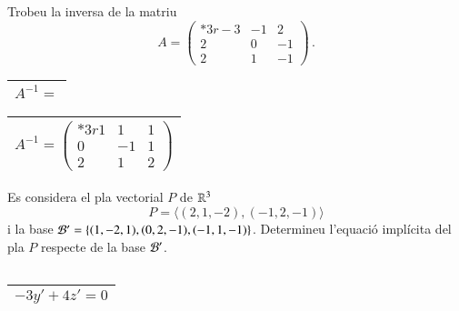\documentclass[11pt,catalan]{article}
\begin{document}
\begin{enunciat}
Trobeu la inversa de la matriu 
\[
  A = \begin{pmatrix}{*{3}r} -3 & -1 & 2\\ 2 & 0 & -1\\ 2 & 1 & -1\end{pmatrix}\,.
\]
\end{enunciat}

\begin{quadricula}
\begin{tabular}{|L{5cm}{1.25cm}|}
\hline
$A^{-1}=$ \\
\hline
\end{tabular}
\end{quadricula}

\begin{solucio}
\begin{center}
\begin{tabular}{|C{5cm}{1.25cm}|}
\hline
$A^{-1}=\begin{pmatrix}{*{3}r} 1 & 1 & 1\\ 0 & -1 & 1\\ 2 & 1 & 2\end{pmatrix}$ \\
\hline
\end{tabular}
\end{center}
\end{solucio}


\begin{enunciat}
Es considera el pla vectorial $P$ de $\rn 3$
\[
  P = \langle (2,1,-2), (-1,2,-1) \rangle
\]
i la base $\cal B'=\{(1,-2,1),(0,2,-1),(-1,1,-1)\}$. Determineu l'equació implícita del pla $P$ respecte de la base $\cal B'$.
\end{enunciat}

\begin{quadricula}
\begin{tabular}{|C{5cm}{0.5cm}|}
\hline
 \\
\hline
\end{tabular}
\end{quadricula}

\begin{solucio}
\begin{center}
\begin{tabular}{|C{5cm}{0.5cm}|}
\hline
$- 3 y' + 4 z' = 0$ \\
\hline
\end{tabular}
\end{center}
\end{solucio}
\end{document}
